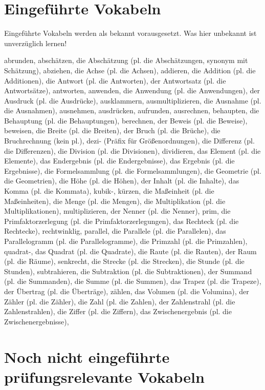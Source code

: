 \section{Eingeführte Vokabeln}

Eingeführte Vokabeln werden als bekannt vorausgesetzt. Was hier unbekannt ist unverzüglich lernen!

abrunden,
abschätzen,
die Abschätzung (pl. die Abschätzungen, synonym mit Schätzung),
abziehen,
die Achse (pl. die Achsen),
addieren,
die Addition (pl. die Additionen),
die Antwort (pl. die Antworten),
der Antwortsatz (pl. die Antwortsätze),
antworten,
anwenden,
die Anwendung (pl. die Anwendungen),
der Ausdruck (pl. die Ausdrücke),
ausklammern,
ausmultiplizieren,
die Ausnahme (pl. die Ausnahmen),
ausnehmen,
ausdrücken,
aufrunden,
ausrechnen,
behaupten,
die Behauptung (pl. die Behauptungen),
berechnen,
der Beweis (pl. die Beweise),
beweisen,
die Breite (pl. die Breiten),
der Bruch (pl. die Brüche),
die Bruchrechnung (kein pl.),
dezi- (Präfix für Größenordnungen),
die Differenz (pl. die Differenzen),
die Division (pl. die Divisionen),
dividieren,
das Element (pl. die Elemente),
das Endergebnis (pl. die Endergebnisse),
das Ergebnis (pl. die Ergebnisse),
die Formelsammlung (pl. die Formelsammlungen),
die Geometrie (pl. die Geometrien),
die Höhe (pl. die Höhen),
der Inhalt (pl. die Inhalte),
das Komma (pl. die Kommata),
kubik-,
kürzen,
die Maßeinheit (pl. die Maßeinheiten),
die Menge (pl. die Mengen),
die Multiplikation (pl. die Multiplikationen),
multiplizieren,
der Nenner (pl. die Nenner),
prim,
die Primfaktorzerlegung (pl. die Primfaktorzerlegungen),
das Rechteck (pl. die Rechtecke),
rechtwinklig,
parallel,
die Parallele (pl. die Parallelen),
das Parallelogramm (pl. die Parallelogramme),
die Primzahl (pl. die Primzahlen),
quadrat-,
das Quadrat (pl. die Quadrate),
die Raute (pl. die Rauten),
der Raum (pl. die Räume),
senkrecht,
die Strecke (pl. die Strecken),
die Stunde (pl. die Stunden),
subtrahieren,
die Subtraktion (pl. die Subtraktionen),
der Summand (pl. die Summanden),
die Summe (pl. die Summen),
das Trapez (pl. die Trapeze),
der Übertrag (pl. die Überträge),
zählen,
das Volumen (pl. die Volumina),
der Zähler (pl. die Zähler),
die Zahl (pl. die Zahlen),
der Zahlenstrahl (pl. die Zahlenstrahlen),
die Ziffer (pl. die Ziffern),
das Zwischenergebnis (pl. die Zwischenergebnisse),

\section{Noch nicht eingeführte prüfungsrelevante Vokabeln}

